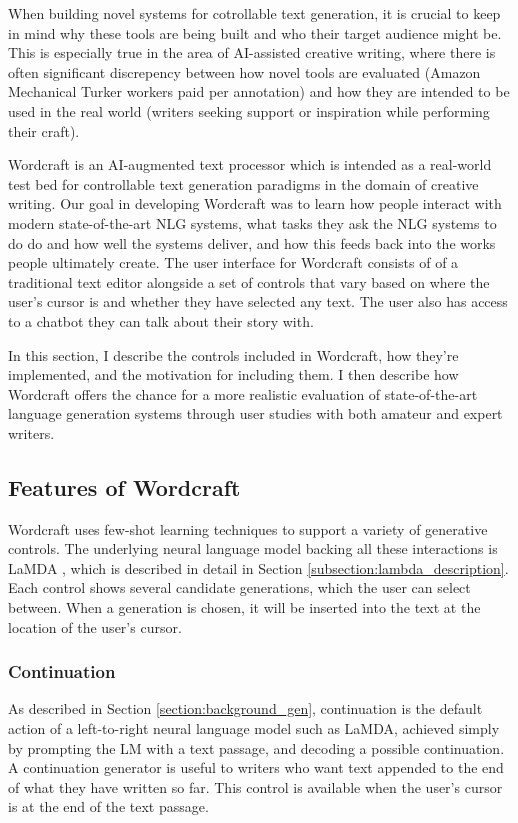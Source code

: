When building novel systems for cotrollable text generation, it is crucial to keep in mind why these tools are being built and who their target audience might be.
This is especially true in the area of AI-assisted creative writing, where there is often significant discrepency between how novel tools are evaluated (Amazon Mechanical Turker workers paid per annotation) and how they are intended to be used in the real world (writers seeking support or inspiration while performing their craft).

Wordcraft is an AI-augmented text processor which is intended as a real-world test bed for controllable text generation paradigms in the domain of creative writing.
Our goal in developing Wordcraft was to learn how people interact with modern state-of-the-art NLG systems, what tasks they ask the NLG systems to do do and how well the systems deliver, and how this feeds back into the works people ultimately create.
The user interface for Wordcraft consists of of a traditional text editor alongside a set of controls that vary based on where the user's cursor is and whether they have selected any text.
The user also has access to a chatbot they can talk about their story with.

In this section, I describe the controls included in  Wordcraft, how they're implemented, and the motivation for including them.
I then describe how Wordcraft offers the chance for a more realistic evaluation of state-of-the-art language generation systems through user studies with both amateur and expert writers.


\subsection{Features of Wordcraft}
\label{section:wordcraft_controls}
Wordcraft uses few-shot learning techniques \cite{brown2020language} to support a variety of generative controls.
The underlying neural language model backing all these interactions is LaMDA \cite{thoppilan2022lamda}, which is described in detail in Section \ref{subsection:lambda_description}.
Each control shows several candidate generations, which the user can select between.
When a generation is chosen, it will be inserted into the text at the location of the user's cursor.

\subsubsection{Continuation}
As described in Section \ref{section:background_gen}, continuation is the default action of a left-to-right neural language model such as LaMDA, achieved simply by prompting the LM with a text passage, and decoding a possible continuation.
A continuation generator is useful to writers who want text appended to the end of what they have written so far.
This control is available when the user's cursor is at the end of the text passage.

